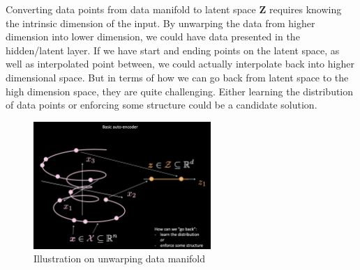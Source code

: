 Converting data points from data manifold to latent space \textbf{Z} requires knowing the intrinsic dimension of the input. By unwarping the data from higher dimension into lower dimension, we could have data presented in the hidden/latent layer. If we have start and ending points on the latent space, as well as interpolated point between, we could actually interpolate back into higher dimensional space. But in terms of how we can go back from latent space to the high dimension space, they are quite challenging. Either learning the distribution of data points or enforcing some structure could be a candidate solution.
\\
\begin{figure}[htb]
    \centering
    \includegraphics[width=0.6\textwidth]{labs/09/images/Data_manifold.png}
    \caption{Illustration on unwarping data manifold}
    \label{fig:Data_manifold}
\end{figure}
\\






